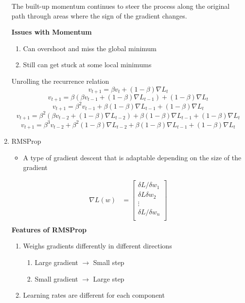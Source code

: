 \begin{enumerate}
\begin{tcolorbox}[title=Numerical Example: Momentum in Action, colback=gray!5, colframe=black!50!gray, width=\textwidth-1cm, center]
The built-up momentum continues to steer the process along the original path through areas where the sign of the gradient changes.
\end{tcolorbox}
    
    \textbf{Issues with Momentum}
    \begin{enumerate}
        \item Can overshoot and miss the global minimum
        \item Still can get stuck at some local minimums
    \end{enumerate}
    Unrolling the recurrence relation
    \[
    v_{t+1} = \beta v_t+(1-\beta)\nabla L_t
    \]
    \[
    v_{t+1} = \beta (\beta v_{t-1} +(1-\beta)\nabla L_{t-1})+(1-\beta)\nabla L_t
    \]
    \[
    v_{t+1}=\beta^2v_{t-1}+\beta(1-\beta)\nabla L_{t-1} +(1-\beta)\nabla L_t
    \]
    \[
    v_{t+1}=\beta^2(\beta v_{t-2}+(1-\beta)\nabla L_{t-2})+\beta(1-\beta)\nabla L_{t-1}+(1-\beta)\nabla L_t
    \]
    \[
    v_{t+1}=\beta^3v_{t-2}+\beta^2(1-\beta)\nabla L_{t-2}+\beta(1-\beta)\nabla L_{t-1}+(1-\beta)\nabla L_t
    \]
    \item RMSProp
    \begin{itemize}
        \item A type of gradient descent that is adaptable depending on the size of the gradient
    \end{itemize}
    \begin{align*}
    \nabla L(w) &= \begin{bmatrix}
           \delta L/\delta w_1    \\
           \delta L\delta w_2    \\
           \vdots   \\
           \delta L/\delta w_n    \\
         \end{bmatrix} \\
    \end{align*}
    \textbf{Features of RMSProp}
    \begin{enumerate}
        \item Weighs gradients differently in different directions
        \begin{enumerate}
            \item Large gradient $\rightarrow$ Small step
            \item Small gradient $\rightarrow$ Large step
        \end{enumerate}
        \item Learning rates are different for each component

\end{enumerate}
\end{enumerate}
